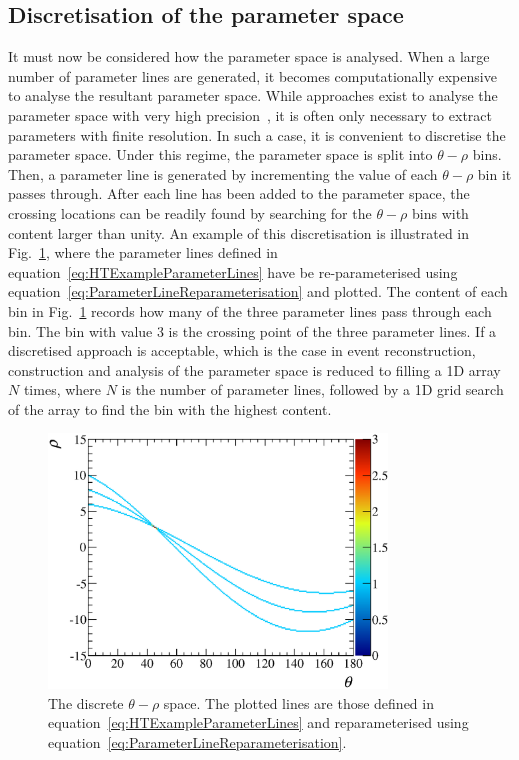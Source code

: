 \subsection{Discretisation of the parameter space}
\label{subsec:ParameterSpaceDiscretisation}
It must now be considered how the parameter space is analysed.  When a large number of parameter lines are generated, it becomes computationally expensive to analyse the resultant parameter space.  While approaches exist to analyse the parameter space with very high precision~\cite{331821}, it is often only necessary to extract parameters with finite resolution.  In such a case, it is convenient to discretise the parameter space.  Under this regime, the parameter space is split into $\theta-\rho$ bins.  Then, a parameter line is generated by incrementing the value of each $\theta-\rho$ bin it passes through.  After each line has been added to the parameter space, the crossing locations can be readily found by searching for the $\theta-\rho$ bins with content larger than unity.  An example of this discretisation is illustrated in Fig.~\ref{fig:BinnedParameterSpace}, where the parameter lines defined in equation~\ref{eq:HTExampleParameterLines} have be re-parameterised using equation~\ref{eq:ParameterLineReparameterisation} and plotted.  The content of each bin in Fig.~\ref{fig:BinnedParameterSpace} records how many of the three parameter lines pass through each bin.  The bin with value 3 is the crossing point of the three parameter lines.
\newline
If a discretised approach is acceptable, which is the case in event reconstruction, construction and analysis of the parameter space is reduced to filling a 1D array $N$ times, where $N$ is the number of parameter lines, followed by a 1D grid search of the array to find the bin with the highest content.
\begin{figure}
  \centering
  \includegraphics[width=9cm]{images/hough_transform/binned_parameter_space}
  \caption{The discrete $\theta-\rho$ space.  The plotted lines are those defined in equation~\ref{eq:HTExampleParameterLines} and reparameterised using equation~\ref{eq:ParameterLineReparameterisation}.}
  \label{fig:BinnedParameterSpace}
\end{figure}



